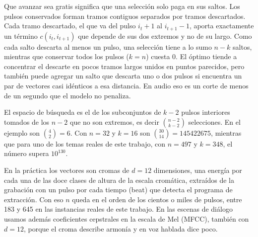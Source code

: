 Que avanzar sea gratis significa que una selección solo paga en sus saltos. Los pulsos conservados forman tramos contiguos separados por tramos descartados. Cada tramo descartado, el que va del pulso $i_t + 1$ al $i_{t+1} - 1$, aporta exactamente un término $c(i_t, i_{t+1})$ que depende de sus dos extremos y no de su largo. Como cada salto descarta al menos un pulso, una selección tiene a lo sumo $n - k$ saltos, mientras que conservar todos los pulsos ($k = n$) cuesta $0$. El óptimo tiende a concentrar el descarte en pocos tramos largos unidos en puntos parecidos, pero también puede agregar un salto que descarta uno o dos pulsos si encuentra un par de vectores casi idénticos a esa distancia. En audio eso es un corte de menos de un segundo que el modelo no penaliza.

El espacio de búsqueda es el de los subconjuntos de $k - 2$ pulsos interiores tomados de los $n - 2$ que no son extremos, es decir $\binom{n-2}{k-2}$ selecciones. En el ejemplo son $\binom{4}{2} = 6$. Con $n = 32$ y $k = 16$ son $\binom{30}{14} = \num{145422675}$, mientras que para uno de los temas reales de este trabajo, con $n = 497$ y $k = 348$, el número supera $10^{130}$.

En la práctica los vectores son cromas de $d = 12$ dimensiones, una energía por cada una de las doce clases de altura de la escala cromática, extraídos de la grabación con un pulso por cada tiempo (beat) que detecta el programa de extracción. Con eso $n$ queda en el orden de los cientos o miles de pulsos, entre 183 y 645 en las instancias reales de este trabajo. En las escenas de diálogo usamos además coeficientes cepstrales en la escala de Mel (MFCC), también con $d = 12$, porque el croma describe armonía y en voz hablada dice poco.
